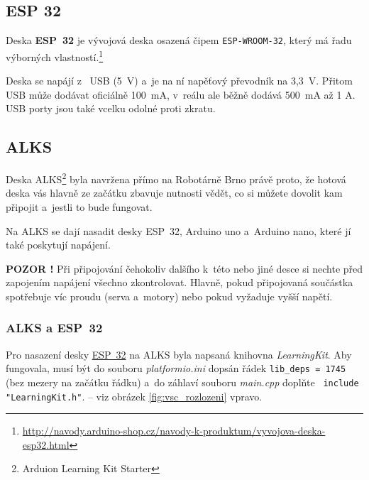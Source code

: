 \label{esp32} \subsection{ESP 32}

Deska {\bf ESP~32}  je vývojová deska osazená čipem {\tt ESP-WROOM-32}, který má řadu výborných vlastností.\footnote{\url{http://navody.arduino-shop.cz/navody-k-produktum/vyvojova-deska-esp32.html} }

Deska se napájí z~ USB (5~V) a~je na ní napěťový převodník
na 3,3~V. Přitom USB může dodávat oficiálně 100~mA, v~reálu ale běžně dodává 500~mA až 1 A. USB porty jsou také vcelku odolné proti zkratu.   

\label{alks} \subsection{ALKS} 

Deska ALKS\footnote{Arduion Learning Kit Starter} byla navržena přímo na Robotárně Brno právě proto, že 
hotová deska   
vás hlavně ze začátku zbavuje nutnosti vědět, co si můžete dovolit kam připojit a~jestli to bude fungovat. 

Na ALKS se dají nasadit desky ESP~32, Arduino uno  a~Arduino nano, které jí také poskytují napájení.  

{\bf POZOR !} Při připojování čehokoliv dalšího k~této nebo jiné desce si nechte před zapojením napájení všechno zkontrolovat. Hlavně, pokud připojovaná součástka spotřebuje víc proudu (serva a~motory) nebo pokud vyžaduje vyšší napětí. 

\label{alks:knihovna} \subsubsection*{ALKS a ESP~32}

Pro nasazení desky   \hyperref[esp32]{ESP~32}
 na ALKS byla  napsaná knihovna {\it LearningKit}. 
Aby fungovala, musí být do souboru {\it platformio.ini} dopsán řádek 
{\tt lib\_deps = 1745} (bez mezery na začátku řádku) a~do záhlaví souboru {\it main.cpp} doplňte 
\verb| include "LearningKit.h"|.
 -- viz obrázek \ref{fig:vsc_rozlozeni} vpravo.


